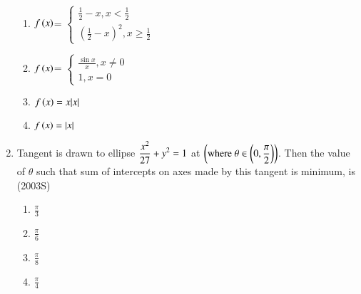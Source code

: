 \documentclass[journal]{IEEEtran}
\begin{document}
\begin{enumerate}[start=9]
\begin{enumerate}
    \item $f\left(x\right)$=
    $\begin{cases}
         \displaystyle\frac{1}{2}-x, x<\displaystyle\frac{1}{2}\\
        \left(\displaystyle\frac{1}{2}-x\right)^2, x\geq \displaystyle\frac{1}{2}
    \end{cases}$\\
     \item $f\left(x\right)$=
    $\begin{cases}
        \displaystyle\frac{\sin x}{x}, x\neq 0\\
        1, x=0
    \end{cases}$\\
    \item $f\left(x\right)=x|x|$
    \item $f\left(x\right)= |x|$\\
\end{enumerate}
\item Tangent is drawn to ellipse $\displaystyle\displaystyle\frac{x^2}{27}+y^2 = 1$ at $\left(\text{where} \ \theta \in  \left(0,\displaystyle\displaystyle\frac{\pi}{2}\right)\right)$. Then the value of $\theta$ such that sum of intercepts on axes made by this tangent is minimum, is
\hfill {(2003S)}
\begin{multicols}{4}
\begin{enumerate}
    \item $\displaystyle\frac{\pi}{3}$\\
    \item $\displaystyle\frac{\pi}{6}$\\
    \item $\displaystyle\frac{\pi}{8}$\\
    \item $\displaystyle\frac{\pi}{4}$\\
 \end{enumerate}
\end{multicols}
\end{enumerate}
\end{document}
